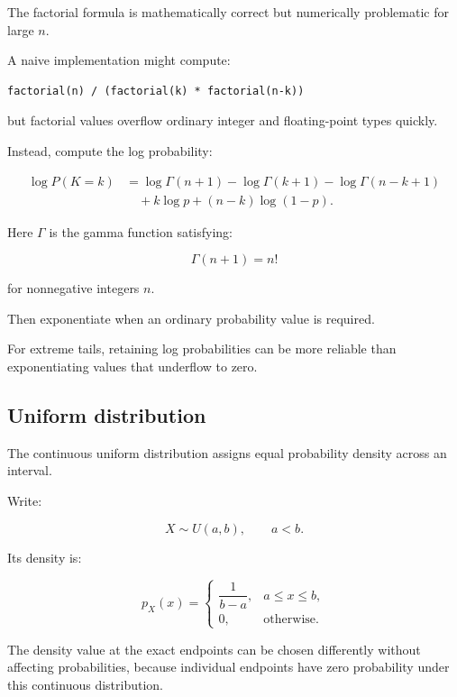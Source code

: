 \hypertarget{02-foundations-ii-ch023-numerically-stable-binomial-probabilities}{}

The factorial formula is mathematically correct but numerically problematic for large \(n\).

A naive implementation might compute:

\begin{verbatim}
factorial(n) / (factorial(k) * factorial(n-k))
\end{verbatim}

but factorial values overflow ordinary integer and floating-point types quickly.

Instead, compute the log probability:

\[
 \begin{aligned} \log P(K=k) &= \log\Gamma(n+1) -\log\Gamma(k+1) -\log\Gamma(n-k+1)\\ &\quad+k\log p+(n-k)\log(1-p). \end{aligned}
\]

Here \(\Gamma\) is the gamma function satisfying:

\[
 \Gamma(n+1)=n!
\]

for nonnegative integers \(n\).

Then exponentiate when an ordinary probability value is required.

For extreme tails, retaining log probabilities can be more reliable than exponentiating values that underflow to zero.

\subsection{Uniform distribution}\label{02-foundations-ii-ch023-uniform-distribution}

\hypertarget{02-foundations-ii-ch023-uniform-distribution}{}

The continuous uniform distribution assigns equal probability density across an interval.

Write:

\[
 X\sim U(a,b), \qquad a<b.
\]

Its density is:

\[
 \boxed{ p_X(x)= \begin{cases} \dfrac1{b-a},&a\le x\le b,\\ 0,&\text{otherwise}. \end{cases} }
\]

The density value at the exact endpoints can be chosen differently without affecting probabilities, because individual endpoints have zero probability under this continuous distribution.

